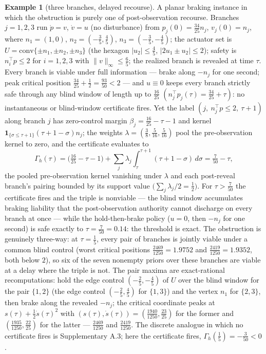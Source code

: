 \documentclass[10pt,twocolumn]{article}
\theoremstyle{definition}
\newtheorem{example}{Example}
\begin{document}
\begin{example}[three branches, delayed recourse]\label{calc-ex:three-branch}
A planar braking instance in which the obstruction is purely one of
post-observation recourse. Branches \(j = 1, 2, 3\) run \(\dot p = v\),
\(\dot v = u\) (no disturbance) from
\(p_j(0) = \tfrac{34}{25} n_j\), \(v_j(0) = n_j\), where
\(n_1 = (1, 0)\), \(n_2 = (-\tfrac{3}{5}, \tfrac{4}{5})\),
\(n_3 = (-\tfrac{3}{5}, -\tfrac{4}{5})\); the actuator set is
\(U = \mathrm{conv}\{\pm n_1, \pm n_2, \pm n_3\}\) (the hexagon
\(|u_2| \le \tfrac45\), \(|2u_1 \pm u_2| \le 2\)); safety is
\(n_i^{\top} p \le 2\) for \(i = 1, 2, 3\) with
\(\|v\|_\infty \le \tfrac65\); the realized branch is revealed at time
\(\tau\). Every branch is viable under full information --- brake along
\(-n_j\) for one second; peak critical position
\(\tfrac{34}{25} + \tfrac12 = \tfrac{93}{50} < 2\) --- and \(u \equiv 0\)
keeps every branch strictly safe through any blind window of length up to
\(\tfrac{16}{25}\) \((n_j^{\top} p_j(\tau) = \tfrac{34}{25} + \tau)\):
no instantaneous or blind-window certificate fires. Yet the label
\((j,\ n_j^{\top} p \le 2,\ \tau + 1)\) along branch \(j\) has
zero-control margin \(\beta_j = \tfrac{16}{25} - \tau - 1\) and kernel
\(\mathbf{1}_{\{\sigma \le \tau + 1\}} (\tau + 1 - \sigma) n_j\); the
weights \(\lambda = (\tfrac38, \tfrac5{16}, \tfrac5{16})\) pool the
pre-observation kernel to zero, and the certificate evaluates to \[\Gamma_{h}(\tau) = \Big(\tfrac{16}{25} - \tau - 1\Big) + \sum_{j} \lambda_{j} \int_{\tau}^{\tau+1} (\tau + 1 - \sigma)\, d\sigma = \tfrac{7}{50} - \tau,\] the pooled pre-observation kernel vanishing under \(\lambda\) and each post-reveal branch's pairing bounded by its support value \(\big(\sum_{j} \lambda_{j}/2 = \tfrac{1}{2}\big)\). For \(\tau > \tfrac{7}{50}\) the certificate fires and the triple is nonviable --- the blind window
accumulates braking liability that the post-observation authority cannot
discharge on every branch at once --- while the hold-then-brake policy
(\(u = 0\), then \(-n_j\) for one second) is safe exactly to
\(\tau = \tfrac{7}{50} = 0.14\): the threshold is exact. The obstruction
is genuinely three-way: at \(\tau = \tfrac15\), every pair of branches is
jointly viable under a common blind control (worst critical positions
\(\tfrac{2469}{1250} = 1.9752\) and \(\tfrac{2419}{1250} = 1.9352\), both
below \(2\)), so six of the seven nonempty priors over these branches are
viable at a delay where the triple is not. The pair maxima are exact-rational recomputations: hold the edge control \((-\tfrac25, -\tfrac45)\) of \(U\) over the blind window for the pair \(\{1,2\}\) (the edge control \((-\tfrac25, \tfrac45)\) for \(\{1,3\}\)) and the vertex \(n_1\) for \(\{2,3\}\), then brake along the revealed \(-n_j\); the critical coordinate peaks at \(s(\tau)+\tfrac12\dot s(\tau)^{2}\) with \((s(\tau),\dot s(\tau))=(\tfrac{1940}{1250},\tfrac{23}{25})\) for the former and \((\tfrac{1935}{1250},\tfrac{22}{25})\) for the latter --- \(\tfrac{2469}{1250}\) and \(\tfrac{2419}{1250}\). The discrete analogue in which no
certificate fires is Supplementary A.3; here the certificate fires, \(\Gamma_{h}(\tfrac15) = -\tfrac3{50} < 0\).
\end{example}
\end{document}
